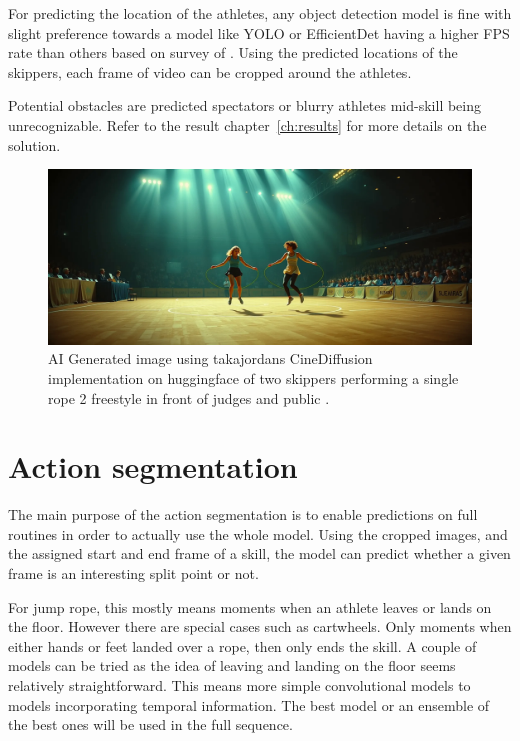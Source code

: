 For predicting the location of the athletes, any object detection model is fine with slight preference towards a model like YOLO or EfficientDet having a higher FPS rate than others based on survey of \textcite{Zaidi_2021}.
Using the predicted locations of the skippers, each frame of video can be cropped around the athletes.

Potential obstacles are predicted spectators or blurry athletes mid-skill being unrecognizable. Refer to the result chapter~\ref{ch:results} for more details on the solution.

\begin{figure}
    \centering
    \includegraphics[width=0.95\linewidth]{img/sr2-performance-ai-generated-HF-cinedifusion.png}
    \caption[AI Generated image using takajordans CineDiffusion implementation on huggingface of two skippers performing a single rope 2 freestyle in front of judges and public]{AI Generated image using takajordans CineDiffusion implementation on huggingface of two skippers performing a single rope 2 freestyle in front of judges and public \autocite{HF_takarajordan_CineDiffusion}.}
    \label{fig:sr2-performance-ai-generated}
\end{figure}


\section{Action segmentation}

The main purpose of the action segmentation is to enable predictions on full routines in order to actually use the whole model. Using the cropped images, and the assigned start and end frame of a skill, the model can predict whether a given frame is an interesting split point or not.

For jump rope, this mostly means moments when an athlete leaves or lands on the floor. However there are special cases such as cartwheels. Only moments when either hands or feet landed over a rope, then only ends the skill. A couple of models can be tried as the idea of leaving and landing on the floor seems relatively straightforward. This means more simple convolutional models to models incorporating temporal information.
The best model or an ensemble of the best ones will be used in the full sequence.

